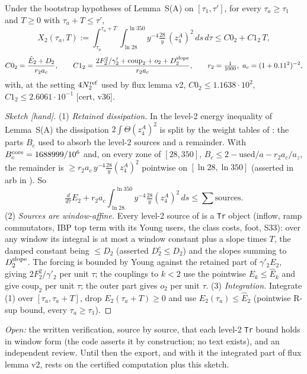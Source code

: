 \begin{lemma}[Lemma D, $k=2$]\label{D:k2}
Under the bootstrap hypotheses of Lemma~S(A) on $[\tau_1,\tau']$, for every $\tau_a\ge\tau_1$ and $T\ge0$ with $\tau_a+T\le\tau'$,
\[X_2(\tau_a,T):=\int_{\tau_a}^{\tau_a+T}\!\int_{\ln28}^{\ln350}y^{-4}\tfrac{28}{y}\,(z^A_4)^2\,ds\,d\tau\le C0_2+C1_2\,T,\]
\[C0_2=\frac{\hat E_2+D_2}{r_2a_c},\qquad C1_2=\frac{2F_2^2/\gamma'_2+\mathrm{coup}_2+o_2+D_2^{\rm slope}}{r_2a_c},\qquad r_2=\tfrac1{1000},\ a_c=(1+0.11^2)^{-2},\]
with, at the setting $4N_2^{\rm ref}$ used by flux lemma v2, $C0_2\le1.1638\cdot10^{2}$, $C1_2\le2.6061\cdot10^{-1}$ [cert, v36].
\end{lemma}
\begin{proof}[Sketch \textup{[hand]}]
(1) \emph{Retained dissipation.} In the level-2 energy inequality of Lemma~S(A) the dissipation $2\int\Theta(z^A_4)^2$ is split by the weight tables of : the parts $B_c$ used to absorb the level-2 sources and a remainder. With $B_c^{\rm core}=1688999/10^6$ and, on every zone of $[28,350]$, $B_c\le2-\mathrm{used}/a-r_2a_c/a_z$, the remainder is $\ge r_2a_c\,y^{-4}\frac{28}{y}(z^A_4)^2$ pointwise on $[\ln28,\ln350]$ (asserted in arb in ). So
\[\tfrac{d}{d\tau}E_2+r_2a_c\int_{\ln28}^{\ln350}y^{-4}\tfrac{28}{y}(z^A_4)^2\,ds\le\textstyle\sum\mathrm{sources}.\]
(2) \emph{Sources are window-affine.} Every level-2 source of  is a \texttt{Tr} object (inflow, ramp commutators, IBP top term with its Young users, the class costs, foot, S33): over any window its integral is at most a window constant plus a slope times $T$, the damped constant being $\le D_2$ (asserted $D_2^c\le D_2$) and the slopes summing to $D_2^{\rm slope}$. The forcing is bounded by Young against the retained part of $\gamma'_2E_2$, giving $2F_2^2/\gamma'_2$ per unit $\tau$; the couplings to $k<2$ use the pointwise $E_k\le\hat E_k$ and give $\mathrm{coup}_2$ per unit $\tau$; the outer part gives $o_2$ per unit $\tau$.
(3) \emph{Integration.} Integrate (1) over $[\tau_a,\tau_a+T]$, drop $E_2(\tau_a+T)\ge0$ and use $E_2(\tau_a)\le\hat E_2$ (pointwise R-sup bound, every $\tau_a\ge\tau_1$).
\end{proof}
\noindent\emph{Open:} the written verification, source by source, that each level-2 \texttt{Tr} bound holds in window form (the code asserts it by construction; no text exists), and an independent review. Until then the export, and with it the integrated part of flux lemma v2, rests on the certified computation plus this sketch.
